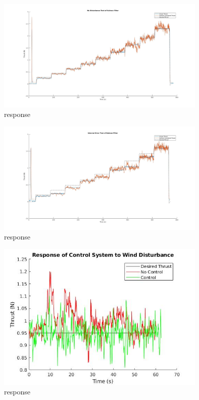 \documentclass[conference]{IEEEtran}
\begin{document}
\begin{figure}[htbp]
\includegraphics[width=10cm]{images/Figure_2/kalman.jpg}
\caption{response}
\label{kalman}
\end{figure}
\begin{figure}[htbp]
	\includegraphics[width=10cm]{images/Figure_2/pwm_reduc.jpg}
	\caption{response}
	\label{pwm_reduc}
\end{figure}
\begin{figure}[htbp]
	\includegraphics[width=10cm]{images/Figure_2/wind_disturbance.jpg}
	\caption{response}
	\label{wind_disturbance}
\end{figure}

	
\end{document}
